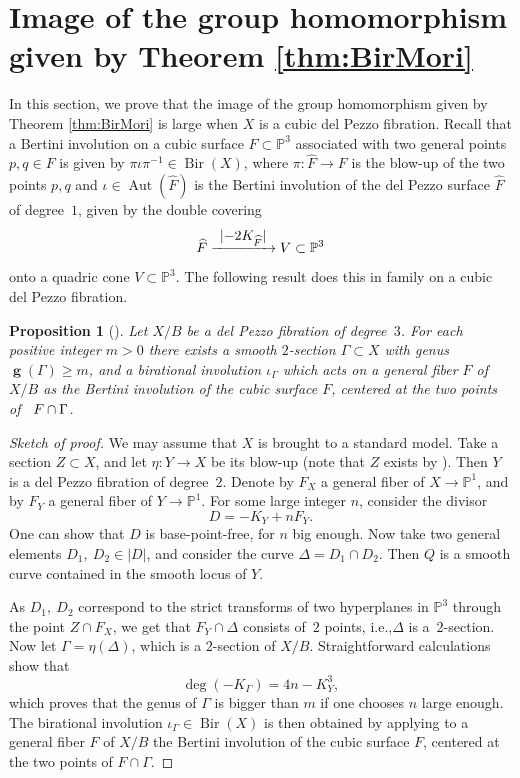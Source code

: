 \documentclass[11pt]{article}
\newcommand{\ie}{i.e.,\xspace}
\numberwithin{equation}{section}
\def\To#1{\mathchoice{\xrightarrow{\textstyle\kern4pt#1\kern3pt}}{\stackrel{#1}{\longrightarrow}}{}{}}
\DeclareMathOperator{\Bir}{Bir}
\DeclareMathOperator{\Aut}{Aut}
\DeclareMathOperator{\inv}{\boldsymbol{g}}
\theoremstyle{plain}
\newtheorem{prop}[thm]{Proposition}
\theoremstyle{definition}
\newcommand{\PP}{\mathbb P}
\begin{document}
\section{Image of the group homomorphism given by Theorem \ref{thm:BirMori}}\label{sec: image}

In this section, we prove that the image of the group homomorphism given by Theorem \ref{thm:BirMori} is large when $X$ is a cubic del Pezzo fibration. Recall that a Bertini involution on a cubic surface $F\subset \PP^3$ associated with two general points $p,q\in F$ is given by $\pi\iota\pi^{-1}\in \Bir(X)$, where $\pi\colon \widehat{F}\to F$ is the blow-up of the two points $p,q$ and $\iota\in \Aut(\widehat{F})$ is the Bertini involution of the del Pezzo surface $\widehat{F}$ of degree~$1$, given by the double covering
\[
\widehat{F}\To{\lvert -2K_{\widehat F}\rvert}V\subset \PP^3
\]
onto a quadric cone $V\subset \PP^3$. The following result does this in family on a cubic del Pezzo fibration.

\begin{prop}[{\cite[Prop.\,5.3]{BCDP}}]\label{prop: genus is unbounded}
Let $X/B$ be a del Pezzo fibration of degree~$3$. For each positive integer $m>0$ there exists a smooth $2$-section $\Gamma\subset X$ with genus $\inv(\Gamma)\ge m$, and a birational involution $\iota_\Gamma$ which acts on a general fiber $F$ of~$X/B$ as the Bertini involution of the cubic surface $F$, centered at the two points of ~$F\cap\nobreak \Gamma$.
\end{prop}
\begin{proof}[Sketch of proof]
We may assume that $X$ is brought to a standard model. Take a section $Z\subset X$, and let $\eta: Y\to X$ be its blow-up (note that $Z$ exists by \cite[IV, Th.\,6.8]{Kollar_rational}). Then $Y$ is a del Pezzo fibration of degree~$2$. Denote by $F_X$ a general fiber of $X\to\PP^1$, and by $F_Y$ a general fiber of $Y\to\PP^1$. For some large integer $n$, consider the divisor
\[
D=-K_Y+nF_Y.
\]
One can show that $D$ is base-point-free, for $n$ big enough. Now take two general elements $D_1,\ D_2\in |D|$, and consider the curve $\Delta=D_1\cap D_2$. Then $Q$ is a smooth curve contained in the smooth locus of $Y$.

As $D_1,\ D_2$ correspond to the strict transforms of two hyperplanes in $\PP^3$ through the point $Z\cap F_X$, we get that $F_Y\cap\Delta$ consists of~$2$ points, \ie $\Delta$ is a~$2$-section. Now let $\Gamma=\eta(\Delta)$, which is a $2$-section of $X/B$. Straightforward calculations show that
\[
\deg(-K_\Gamma)=4n-K_Y^3,
\]
which proves that the genus of $\Gamma$ is bigger than $m$ if one chooses $n$ large enough. The birational involution $\iota_\Gamma\in \Bir(X)$ is then obtained by applying to a general fiber $F$ of $X/B$ the Bertini involution of the cubic surface $F$, centered at the two points of $F\cap \Gamma$.
\end{proof}
\end{document}
